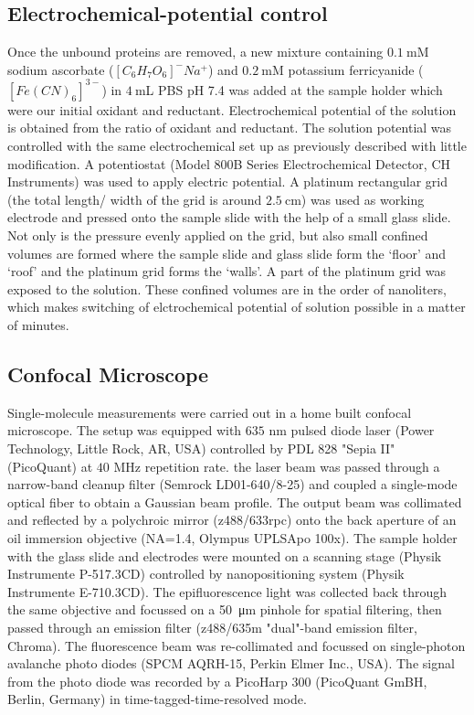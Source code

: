 \documentclass[journal=jacsat,manuscript=article]{achemso}
\begin{document}
\subsection{Electrochemical-potential control}
Once the unbound proteins are removed, a new mixture containing $0.1~$mM sodium ascorbate ($[C_6H_7O_6]^-Na^+$) and $0.2~$mM potassium ferricyanide ($[Fe(CN)_6]^{3-}$) in $4~$mL PBS pH 7.4 was added at the sample holder which were our initial oxidant and reductant. Electrochemical potential of the solution is obtained from the ratio of oxidant and reductant. The solution potential was controlled with the same electrochemical set up as previously described\cite{zhang2017gold} with little modification. A potentiostat (Model 800B Series Electrochemical Detector, CH Instruments) was used to apply electric potential. A platinum rectangular grid (the total length/ width of the grid is around $2.5~$cm) was used as working electrode and pressed onto the sample slide with the help of a small glass slide. Not only is the pressure evenly applied on the grid, but also small confined volumes are formed where the sample slide and glass slide form the `floor' and `roof' and the platinum grid forms the `walls'. A part of the platinum grid was exposed to the solution. These confined volumes are in the order of nanoliters, which makes switching of elctrochemical potential of solution possible in a matter of minutes.
\subsection{Confocal Microscope}
Single-molecule measurements were carried out in a home built confocal microscope. The setup was equipped with $635$ nm pulsed diode laser (Power Technology, Little Rock, AR, USA) controlled by PDL 828 "Sepia II" (PicoQuant) at $40$ MHz repetition rate. the laser beam was passed through a narrow-band cleanup filter (Semrock LD01-640/8-25) and coupled a single-mode optical fiber to obtain a Gaussian beam profile. The output beam was collimated and reflected by a polychroic mirror (z488/633rpc) onto the back aperture of an oil immersion objective (NA=1.4, Olympus UPLSApo 100x). The sample holder with the glass slide and electrodes were mounted on a scanning stage (Physik Instrumente P-517.3CD) controlled by nanopositioning system (Physik Instrumente E-710.3CD). The epifluorescence light was collected back through the same objective and focussed on a \SI{50}{\micro\metre} pinhole for spatial filtering, then passed through an emission filter (z488/635m "dual"-band emission filter, Chroma). The fluorescence beam was re-collimated and focussed on single-photon avalanche photo diodes (SPCM AQRH-15, Perkin Elmer Inc., USA). The signal from the photo diode was recorded by a PicoHarp 300 (PicoQuant GmBH, Berlin, Germany) in time-tagged-time-resolved mode.
\end{document}
